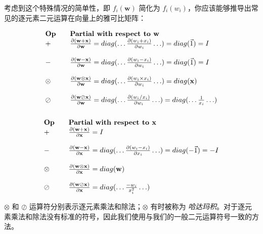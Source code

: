 \documentclass[lang=cn,newtx,10pt,scheme=chinese]{elegantbook}
\begin{document}
考虑到这个特殊情况的简单性，即 $f_i(\mathbf{w})$ 简化为 $f_i(w_i)$，你应该能够推导出常见的逐元素二元运算在向量上的雅可比矩阵：

\[
\begin{array}{lllllllll}
        \text{\bf{Op}} &  & {\text{\bf Partial with respect to }} \mathbf{w} \\
        + &  & \frac{\partial (\mathbf{w+x})}{\partial \mathbf{w}} = diag(\ldots \frac{\partial (w_i + x_i)}{\partial w_i} \ldots) = diag(\vec{1}) = I \\\\
        - &  & \frac{\partial (\mathbf{w-x})}{\partial \mathbf{w}}  =  diag(\ldots\frac{\partial (w_i - x_i)}{\partial w_i}\ldots) =  diag(\vec{1})  =  I \\\\
        \otimes &  & \frac{\partial (\mathbf{w \otimes x})}{\partial \mathbf{w}}  =  diag(\ldots\frac{\partial (w_i \times x_i)}{\partial w_i} \ldots)  =  diag(\mathbf{x}) \\\\
        \oslash &  & \frac{\partial (\mathbf{w \oslash x})}{\partial \mathbf{w}}  =  diag(\ldots\frac{\partial (w_i / x_i)}{\partial w_i}\ldots)  =  diag(\ldots \frac{1}{x_i} \ldots) \\\\
\end{array}
\]\[
\begin{array}{lllllllll}
        \text{\bf{Op}} &  &  {\text{\bf Partial with respect to }}\mathbf{x}\\
        + &  & \frac{\partial (\mathbf{w+x})}{\partial \mathbf{x}} =  I\\\\
        - &  & \frac{\partial (\mathbf{w-x})}{\partial \mathbf{x}}  =  diag(\ldots\frac{\partial (w_i - x_i)}{\partial x_i}\ldots)  =  diag(-\vec{1})  =  -I \\\\
        \otimes &  &  \frac{\partial (\mathbf{w \otimes x})}{\partial \mathbf{x}}  =  diag(\mathbf{w})\\\\
        \oslash &  &  \frac{\partial (\mathbf{w \oslash x})}{\partial \mathbf{x}}  =  diag(\ldots \frac{-w_i}{x_i^2} \ldots)\\
\end{array}
\]

$\otimes$ 和 $\oslash$ 运算符分别表示逐元素乘法和除法；$\otimes$ 有时被称为 {\em 哈达玛积}。对于逐元素乘法和除法没有标准的符号，因此我们使用与我们的一般二元运算符号一致的方法。
\end{document}
